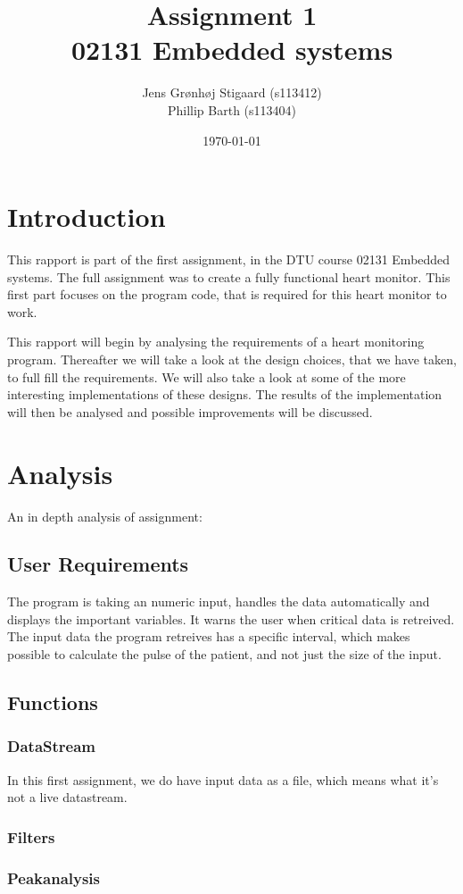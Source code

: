 \documentclass[12pt, danish, a4paper, titlepage]{article}
\title{{\huge Assignment 1}\\02131 Embedded systems}
\author{
		Jens Grønhøj Stigaard 	(s113412)\\
		Phillip Barth 		(s113404)
}
\date{\small \today}
\begin{document}
	\maketitle	
	
	\tableofcontents
	\newpage	
	
	\section{Introduction}
	This rapport is part of the first assignment, in the DTU course 02131 Embedded systems.
	The full assignment was to create a fully functional heart monitor. This first part focuses on the program code, that is required for this heart monitor to work.
	
	\noindent This rapport will begin by analysing the requirements of a heart monitoring program. Thereafter we will take a look at the design choices, that we have taken, to full fill the requirements. 
	We will also take a look at some of the more interesting implementations of these designs.
	The results of the implementation will then be analysed and possible improvements will be discussed. 
	\newpage
	\section{Analysis}
	An in depth analysis of assignment:
		\subsection{User Requirements}
		The program is taking an numeric input, handles the data automatically and displays the important variables. It warns the user when critical data is retreived. The input data the program retreives has a specific interval, which makes possible to calculate the pulse of the patient, and not just the size of the input. 
		\subsection{Functions}
			\subsubsection{DataStream}
				In this first assignment, we do have input data as a file, which means what it's not a live datastream. 
			\subsubsection{Filters}
			\subsubsection{Peakanalysis}
\end{document}
